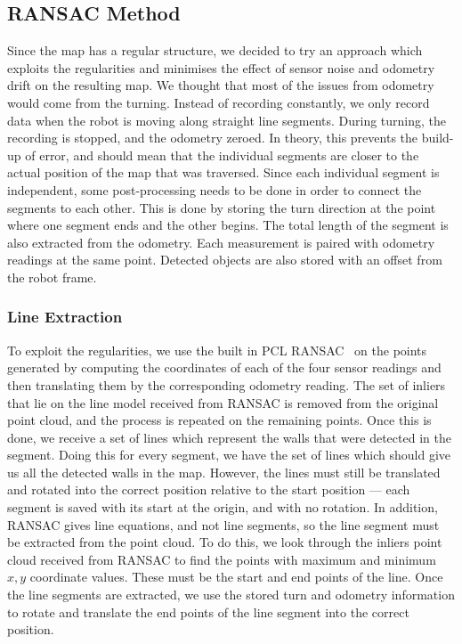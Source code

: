 \documentclass[10pt,a4paper,twocolumn]{article}
\begin{document}
\subsection{RANSAC Method}
Since the map has a regular structure, we decided to try an approach which
exploits the regularities and minimises the effect of sensor noise and odometry
drift on the resulting map. We thought that most of the issues from odometry
would come from the turning. Instead of recording constantly, we only record
data when the robot is moving along straight line segments. During turning, the
recording is stopped, and the odometry zeroed. In theory, this prevents the
build-up of error, and should mean that the individual segments are closer to
the actual position of the map that was traversed. Since each individual segment
is independent, some post-processing needs to be done in order to connect the
segments to each other. This is done by storing the turn direction at the point
where one segment ends and the other begins. The total length of the segment is
also extracted from the odometry. Each measurement is paired with odometry
readings at the same point. Detected objects are also stored with an offset from
the robot frame.

\subsubsection{Line Extraction}

To exploit the regularities, we use the built in PCL
RANSAC~\cite{fischler1981random} on the points generated by computing the
coordinates of each of the four sensor readings and then translating them by the
corresponding odometry reading. The set of inliers that lie on the line model
received from RANSAC is removed from the original point cloud, and the process
is repeated on the remaining points. Once this is done, we receive a set of
lines which represent the walls that were detected in the segment. Doing this
for every segment, we have the set of lines which should give us all the
detected walls in the map. However, the lines must still be translated and
rotated into the correct position relative to the start position --- each
segment is saved with its start at the origin, and with no rotation. In
addition, RANSAC gives line equations, and not line segments, so the line
segment must be extracted from the point cloud. To do this, we look through the
inliers point cloud received from RANSAC to find the points with maximum and
minimum $x,y$ coordinate values. These must be the start and end points of the
line. Once the line segments are extracted, we use the stored turn and odometry
information to rotate and translate the end points of the line segment into the
correct position.
\end{document}
